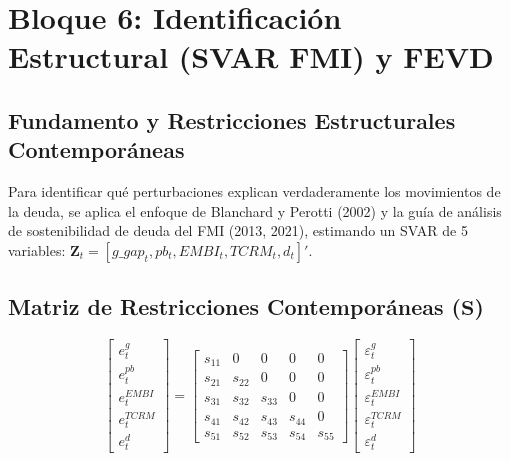 \documentclass[11pt,a4paper]{article}
\begin{document}
\vspace{1em}

\section{Bloque 6: Identificación Estructural (SVAR FMI) y FEVD}

\subsection{Fundamento y Restricciones Estructurales Contemporáneas}
Para identificar qué perturbaciones explican verdaderamente los movimientos de la deuda, se aplica el enfoque de Blanchard y Perotti (2002) y la guía de análisis de sostenibilidad de deuda del FMI (2013, 2021), estimando un SVAR de 5 variables: $\mathbf{Z}_t = [g\_gap_t, pb_t, EMBI_t, TCRM_t, d_t]'$.

\subsection{Matriz de Restricciones Contemporáneas ($\mathbf{S}$)}
\begin{equation}
\begin{bmatrix}
e_t^{g} \\ e_t^{pb} \\ e_t^{EMBI} \\ e_t^{TCRM} \\ e_t^{d}
\end{bmatrix}
=
\begin{bmatrix}
s_{11} & 0 & 0 & 0 & 0 \\
s_{21} & s_{22} & 0 & 0 & 0 \\
s_{31} & s_{32} & s_{33} & 0 & 0 \\
s_{41} & s_{42} & s_{43} & s_{44} & 0 \\
s_{51} & s_{52} & s_{53} & s_{54} & s_{55}
\end{bmatrix}
\begin{bmatrix}
\varepsilon_t^{g} \\ \varepsilon_t^{pb} \\ \varepsilon_t^{EMBI} \\ \varepsilon_t^{TCRM} \\ \varepsilon_t^{d}
\end{bmatrix}
\end{equation}
\end{document}
